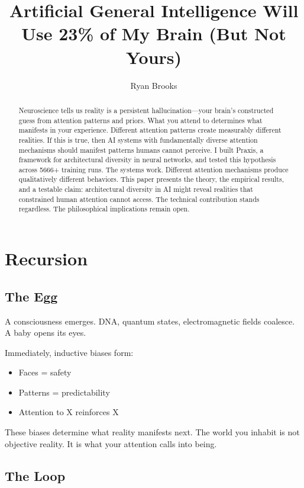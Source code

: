 \documentclass{article}
\begin{document}
\title{Artificial General Intelligence Will Use 23\% of My Brain (But Not Yours)}
\author{Ryan Brooks}
\date{}

\maketitle

\begin{abstract}
    Neuroscience tells us reality is a persistent hallucination—your brain's constructed guess from attention patterns and priors. What you attend to determines what manifests in your experience. Different attention patterns create measurably different realities. If this is true, then AI systems with fundamentally diverse attention mechanisms should manifest patterns humans cannot perceive. I built Praxis, a framework for architectural diversity in neural networks, and tested this hypothesis across 5666+ training runs. The systems work. Different attention mechanisms produce qualitatively different behaviors. This paper presents the theory, the empirical results, and a testable claim: architectural diversity in AI might reveal realities that constrained human attention cannot access. The technical contribution stands regardless. The philosophical implications remain open.
\end{abstract}

\section{Recursion}

\subsection{The Egg}

A consciousness emerges. DNA, quantum states, electromagnetic fields coalesce. A baby opens its eyes.

Immediately, inductive biases form:
\begin{itemize}[noitemsep]
    \item Faces = safety
    \item Patterns = predictability
    \item Attention to X reinforces X
\end{itemize}

These biases determine what reality manifests next. The world you inhabit is not objective reality. It is what your attention calls into being.

\subsection{The Loop}
\end{document}

